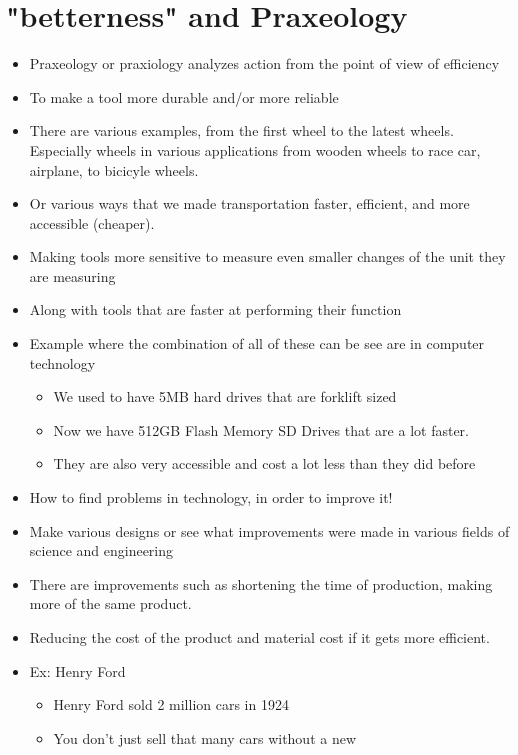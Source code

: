 \documentclass{article}
\begin{document}
\section*{"betterness" and Praxeology}
\begin{itemize}
  \item Praxeology or praxiology analyzes action from the point of view
    of efficiency
  \item To make a tool more durable and/or more
    reliable
  \item There are various examples, from the first wheel
    to the latest wheels. Especially wheels
    in various applications from wooden wheels
    to race car, airplane, to bicicyle wheels.
  \item Or various ways that we made transportation
    faster, efficient, and more accessible (cheaper).
  \item Making tools more sensitive to measure even smaller
    changes of the unit they are measuring
  \item Along with tools that are faster at performing their
    function
  \item Example where the combination of all of these
    can be see are in computer technology
    \begin{itemize}
      \item We used to have 5MB hard drives that are forklift
        sized
      \item Now we have 512GB Flash Memory SD Drives that are
        a lot faster.
      \item They are also very accessible and cost a lot less
        than they did before
    \end{itemize}
  \item How to find problems in technology, in order to
    improve it!
  \item Make various designs or see what improvements were
    made in various fields of science and engineering
  \item There are improvements such as shortening
    the time of production, making more of the same product.
  \item Reducing the cost of the product and material cost
    if it gets more efficient.
  \item Ex: Henry Ford
    \begin{itemize}
      \item Henry Ford sold 2 million cars in 1924
      \item You don't just sell that many cars without a new

\end{itemize}
\end{itemize}
\end{document}
